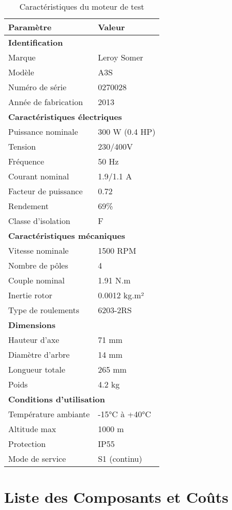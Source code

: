 \begin{table}[h]
\centering
\caption{Caractéristiques du moteur de test}
\begin{tabular}{ll}
\toprule
\textbf{Paramètre} & \textbf{Valeur} \\
\midrule
\multicolumn{2}{l}{\textbf{Identification}} \\
Marque & Leroy Somer \\
Modèle & A3S \\
Numéro de série & 0270028 \\
Année de fabrication & 2013 \\
\midrule
\multicolumn{2}{l}{\textbf{Caractéristiques électriques}} \\
Puissance nominale & 300 W (0.4 HP) \\
Tension & 230/400V \\
Fréquence & 50 Hz \\
Courant nominal & 1.9/1.1 A \\
Facteur de puissance & 0.72 \\
Rendement & 69\% \\
Classe d'isolation & F \\
\midrule
\multicolumn{2}{l}{\textbf{Caractéristiques mécaniques}} \\
Vitesse nominale & 1500 RPM \\
Nombre de pôles & 4 \\
Couple nominal & 1.91 N.m \\
Inertie rotor & 0.0012 kg.m² \\
Type de roulements & 6203-2RS \\
\midrule
\multicolumn{2}{l}{\textbf{Dimensions}} \\
Hauteur d'axe & 71 mm \\
Diamètre d'arbre & 14 mm \\
Longueur totale & 265 mm \\
Poids & 4.2 kg \\
\midrule
\multicolumn{2}{l}{\textbf{Conditions d'utilisation}} \\
Température ambiante & -15°C à +40°C \\
Altitude max & 1000 m \\
Protection & IP55 \\
Mode de service & S1 (continu) \\
\bottomrule
\end{tabular}
\end{table}

\section{Liste des Composants et Coûts}

